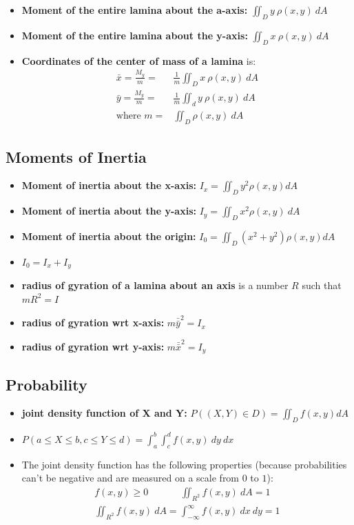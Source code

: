 \documentclass{package/notes}
\begin{document}
\begin{itemize}
	\item \textbf{Moment of the entire lamina about the a-axis:} $\iint_Dy\:\rho(x,y)\:dA$
	\item \textbf{Moment of the entire lamina about the y-axis:} $\iint_D x\:\rho(x,y)\:dA$
	\item \textbf{Coordinates of the center of mass of a lamina} is:
	$$
	\begin{aligned}
		\bar{x} = \frac{M_y}{m}=&\frac{1}{m}\iint_Dx\:\rho(x,y)\:dA\\
		\bar{y} = \frac{M_y}{m}=&\frac{1}{m}\iint_dy\:\rho(x,y)\:dA\\
		\text{where } m=&\iint_D\rho(x,y)\:dA
	\end{aligned}
	$$
\end{itemize}

\subsection{Moments of Inertia}

\begin{itemize}
	\item \textbf{Moment of inertia about the x-axis:} $I_x=\iint_Dy^2\rho(x,y)dA$
	\item \textbf{Moment of inertia about the y-axis:} $I_y = \iint_Dx^2\rho(x,y)\:dA$
	\item \textbf{Moment of inertia about the origin:} $I_0=\iint_D(x^2+y^2)\rho(x,y)dA$
	\item $I_0=I_x+I_y$
	\item \textbf{radius of gyration of a lamina about an axis} is a number $R$ such that $mR^2 = I$
	\item \textbf{radius of gyration wrt x-axis:} $m\bar{\bar{y}}^2=I_x$ 
	\item \textbf{radius of gyration wrt y-axis:} $m\bar{\bar{x}}^2=I_y$
\end{itemize}


\subsection{Probability}

\begin{itemize}
	\item \textbf{joint density function of X and Y:} $P((X,Y)\in D)=\iint_Df(x,y)dA$
	\item $P(a\le X \le b, c \le Y \le d) = \int_a^b\int_c^df(x,y)\:dy\:dx$
	\item The joint density function has the following properties (because probabilities can't be negative and are measured on a scale from $0$ to $1$):
	$$
	\begin{aligned}
		f(x,y)\ge 0\;\;\;\;\;\;\;\;\;\;\;\;\iint_{R^2}f(x,y)\:dA = 1\\
		\iint_{R^2}f(x,y)\:dA=\int_{-\infty}^{\infty}f(x,y)\:dx\:dy=1
	\end{aligned}
	$$
\end{itemize}
\end{document}
